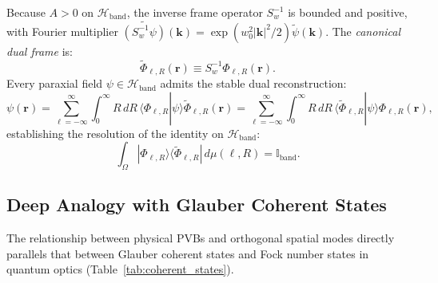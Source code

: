 \documentclass[11pt,a4paper]{article}
\begin{document}
Because $A > 0$ on $\mathcal{H}_{\text{band}}$, the inverse frame operator $S_w^{-1}$ is bounded and positive, with Fourier multiplier $\widetilde{(S_w^{-1} \psi)}(\mathbf{k}) = \exp(w_0^2 |\mathbf{k}|^2 / 2) \widetilde{\psi}(\mathbf{k})$. The \emph{canonical dual frame} is:
\begin{equation}
\widetilde{\Phi}_{\ell, R}(\mathbf{r}) \equiv S_w^{-1} \Phi_{\ell, R}(\mathbf{r}).
\label{eq:canonical_dual_def}
\end{equation}
Every paraxial field $\psi \in \mathcal{H}_{\text{band}}$ admits the stable dual reconstruction:
\begin{equation}
\boxed{\psi(\mathbf{r}) = \sum_{\ell=-\infty}^\infty \int_0^\infty R \, dR \, \langle \Phi_{\ell, R} | \psi \rangle \widetilde{\Phi}_{\ell, R}(\mathbf{r}) = \sum_{\ell=-\infty}^\infty \int_0^\infty R \, dR \, \langle \widetilde{\Phi}_{\ell, R} | \psi \rangle \Phi_{\ell, R}(\mathbf{r}),}
\label{eq:dual_expansion}
\end{equation}
establishing the resolution of the identity on $\mathcal{H}_{\text{band}}$:
\begin{equation}
\int_\Omega |\Phi_{\ell, R}\rangle \langle \widetilde{\Phi}_{\ell, R}| \, d\mu(\ell, R) = \mathbb{I}_{\text{band}}.
\label{eq:resolution_identity}
\end{equation}

\subsection{Deep Analogy with Glauber Coherent States}

The relationship between physical PVBs and orthogonal spatial modes directly parallels that between Glauber coherent states and Fock number states in quantum optics (Table~\ref{tab:coherent_states}).
\end{document}

